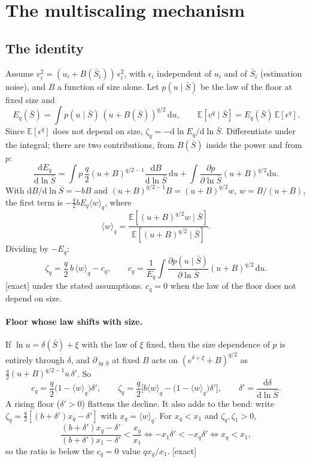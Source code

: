\documentclass[11pt]{article}
\newcommand{\E}{\mathbb E}
\newcommand{\Sb}{\bar S}
\newcommand{\dd}{\mathrm d}
\newcommand{\exact}{\textsf{\small[exact]}}
\begin{document}
\section{The multiscaling mechanism}
\label{sec:identity}

\subsection{The identity}

Assume $v_i^2=(u_i+B(\Sb_i))\,\epsilon_i^2$, with $\epsilon_i$ independent of $u_i$ and of $\Sb_i$ (estimation noise), and $B$ a function
of size alone.  Let $p(u\mid\Sb)$ be the law of the floor at fixed size and
\begin{equation}
E_q(\Sb)=\int p(u\mid\Sb)\,(u+B(\Sb))^{q/2}\,\dd u,\qquad \E[v^q\mid\Sb]=E_q(\Sb)\,\E[\epsilon^q].
\end{equation}
Since $\E[\epsilon^q]$ does not depend on size, $\zeta_q=-\dd\ln E_q/\dd\ln\Sb$.  Differentiate under the integral; there are two
contributions, from $B(\Sb)$ inside the power and from $p$:
\begin{equation}
\frac{\dd E_q}{\dd\ln\Sb}=\int p\,\frac q2(u+B)^{q/2-1}\frac{\dd B}{\dd\ln\Sb}\,\dd u+\int\frac{\partial p}{\partial\ln\Sb}(u+B)^{q/2}\dd u .
\end{equation}
With $\dd B/\dd\ln\Sb=-bB$ and $(u+B)^{q/2-1}B=(u+B)^{q/2}w$, $w=B/(u+B)$, the first term is $-\tfrac q2bE_q\langle w\rangle_q$, where
\begin{equation}
\langle w\rangle_q=\frac{\E[(u+B)^{q/2}w\mid\Sb]}{\E[(u+B)^{q/2}\mid\Sb]} .
\end{equation}
Dividing by $-E_q$:
\begin{equation}
\boxed{\zeta_q=\frac q2\,b\,\langle w\rangle_q-c_q,\qquad c_q=\frac1{E_q}\int\frac{\partial p(u\mid\Sb)}{\partial\ln\Sb}(u+B)^{q/2}\,\dd u .}
\end{equation}
\exact{} under the stated assumptions.  $c_q=0$ when the law of the floor does not depend on size.

\paragraph{Floor whose law shifts with size.}  If $\ln u=\delta(\Sb)+\xi$ with the law of $\xi$ fixed, then the size dependence of $p$
is entirely through $\delta$, and $\partial_{\ln\Sb}$ at fixed $B$ acts on $(e^{\delta+\xi}+B)^{q/2}$ as
$\tfrac q2(u+B)^{q/2-1}u\,\delta'$.  So
\begin{equation}
c_q=\frac q2\big(1-\langle w\rangle_q\big)\delta',\qquad
\zeta_q=\frac q2\Big[b\langle w\rangle_q-\big(1-\langle w\rangle_q\big)\delta'\Big],\qquad \delta'=\frac{\dd\delta}{\dd\ln\Sb}.
\end{equation}
A rising floor ($\delta'>0$) flattens the decline.  It also adds to the bend: write $\zeta_q=\tfrac q2[(b+\delta')x_q-\delta']$ with
$x_q=\langle w\rangle_q$.  For $x_q<x_1$ and $\zeta_q,\zeta_1>0$,
\begin{equation}
\frac{(b+\delta')x_q-\delta'}{(b+\delta')x_1-\delta'}<\frac{x_q}{x_1}\iff -x_1\delta'<-x_q\delta'\iff x_q<x_1 ,
\end{equation}
so the ratio is below the $c_q=0$ value $qx_q/x_1$.  \exact
\end{document}
